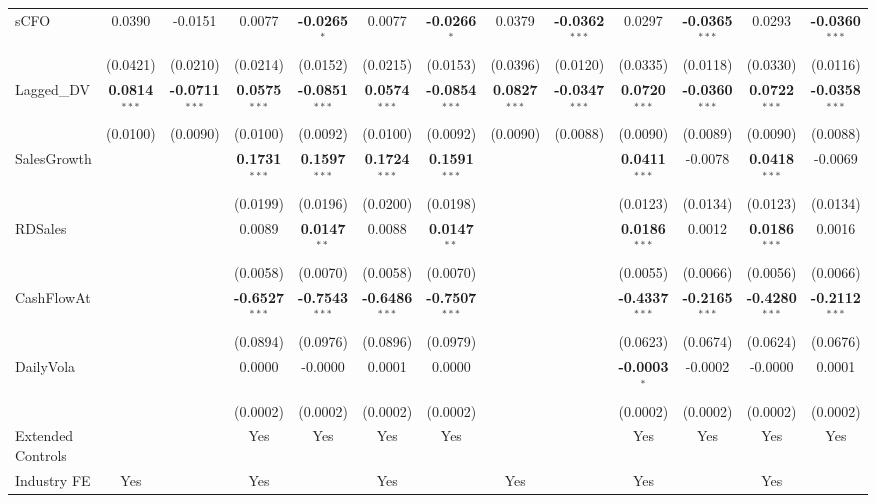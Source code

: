 \begin{landscape}
\begin{table}[H]
\begin{tabular}{lcccccccccccc}
sCFO & 0.0390 & -0.0151 & 0.0077 & \textbf{-0.0265}$^{*}$ & 0.0077 & \textbf{-0.0266}$^{*}$ & 0.0379 & \textbf{-0.0362}$^{***}$ & 0.0297 & \textbf{-0.0365}$^{***}$ & 0.0293 & \textbf{-0.0360}$^{***}$ \\
 & (0.0421) & (0.0210) & (0.0214) & (0.0152) & (0.0215) & (0.0153) & (0.0396) & (0.0120) & (0.0335) & (0.0118) & (0.0330) & (0.0116) \\
Lagged\_DV & \textbf{0.0814}$^{***}$ & \textbf{-0.0711}$^{***}$ & \textbf{0.0575}$^{***}$ & \textbf{-0.0851}$^{***}$ & \textbf{0.0574}$^{***}$ & \textbf{-0.0854}$^{***}$ & \textbf{0.0827}$^{***}$ & \textbf{-0.0347}$^{***}$ & \textbf{0.0720}$^{***}$ & \textbf{-0.0360}$^{***}$ & \textbf{0.0722}$^{***}$ & \textbf{-0.0358}$^{***}$ \\
 & (0.0100) & (0.0090) & (0.0100) & (0.0092) & (0.0100) & (0.0092) & (0.0090) & (0.0088) & (0.0090) & (0.0089) & (0.0090) & (0.0088) \\
SalesGrowth &  &  & \textbf{0.1731}$^{***}$ & \textbf{0.1597}$^{***}$ & \textbf{0.1724}$^{***}$ & \textbf{0.1591}$^{***}$ &  &  & \textbf{0.0411}$^{***}$ & -0.0078 & \textbf{0.0418}$^{***}$ & -0.0069 \\
 &  &  & (0.0199) & (0.0196) & (0.0200) & (0.0198) &  &  & (0.0123) & (0.0134) & (0.0123) & (0.0134) \\
RDSales &  &  & 0.0089 & \textbf{0.0147}$^{**}$ & 0.0088 & \textbf{0.0147}$^{**}$ &  &  & \textbf{0.0186}$^{***}$ & 0.0012 & \textbf{0.0186}$^{***}$ & 0.0016 \\
 &  &  & (0.0058) & (0.0070) & (0.0058) & (0.0070) &  &  & (0.0055) & (0.0066) & (0.0056) & (0.0066) \\
CashFlowAt &  &  & \textbf{-0.6527}$^{***}$ & \textbf{-0.7543}$^{***}$ & \textbf{-0.6486}$^{***}$ & \textbf{-0.7507}$^{***}$ &  &  & \textbf{-0.4337}$^{***}$ & \textbf{-0.2165}$^{***}$ & \textbf{-0.4280}$^{***}$ & \textbf{-0.2112}$^{***}$ \\
 &  &  & (0.0894) & (0.0976) & (0.0896) & (0.0979) &  &  & (0.0623) & (0.0674) & (0.0624) & (0.0676) \\
DailyVola &  &  & 0.0000 & -0.0000 & 0.0001 & 0.0000 &  &  & \textbf{-0.0003}$^{*}$ & -0.0002 & -0.0000 & 0.0001 \\
 &  &  & (0.0002) & (0.0002) & (0.0002) & (0.0002) &  &  & (0.0002) & (0.0002) & (0.0002) & (0.0002) \\
\midrule
Extended Controls &  &  & Yes & Yes & Yes & Yes &  &  & Yes & Yes & Yes & Yes \\
Industry FE & Yes &  & Yes &  & Yes &  & Yes &  & Yes &  & Yes &  \\

\end{tabular}
\end{table}
\end{landscape}

